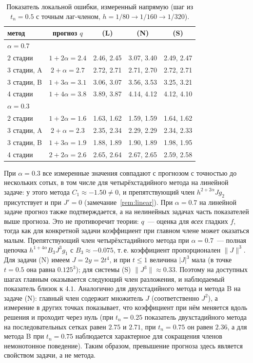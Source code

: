 \documentclass[11pt,a4paper]{article}
\theoremstyle{plain}
\theoremstyle{definition}
\begin{document}
\begin{table}[ht]
\centering\small
\caption{Показатель локальной ошибки, измеренный напрямую (шаг из $t_n=0.5$ с точным лаг-членом, $h=1/80\to1/160\to1/320$).}\label{tab:local}
\begin{tabular}{lcccc}
\toprule
метод & прогноз $q$ & (L) & (N) & (S)\\
\midrule
\multicolumn{5}{l}{$\alpha=0.7$}\\
2 стадии & $1+2\alpha=2.4$ & 2.46, 2.45 & 3.07, 3.40 & 2.49, 2.47\\
3 стадии, A & $2+\alpha=2.7$ & 2.72, 2.71 & 2.71, 2.70 & 2.72, 2.71\\
3 стадии, B & $1+3\alpha=3.1$ & 3.06, 3.07 & 3.56, 3.53 & 3.25, 3.21\\
4 стадии & $1+4\alpha=3.8$ & 3.89, 3.87 & 4.14, 4.12 & 4.12, 4.10\\
\midrule
\multicolumn{5}{l}{$\alpha=0.3$}\\
2 стадии & $1+2\alpha=1.6$ & 1.63, 1.62 & 1.59, 1.59 & 1.64, 1.62\\
3 стадии, A & $2+\alpha=2.3$ & 2.35, 2.34 & 2.29, 2.29 & 2.34, 2.33\\
3 стадии, B & $1+3\alpha=1.9$ & 1.88, 1.89 & 1.90, 1.89 & 1.98, 1.95\\
4 стадии & $2+2\alpha=2.6$ & 2.65, 2.64 & 2.67, 2.65 & 2.59, 2.58\\
\bottomrule
\end{tabular}
\end{table}

При $\alpha=0.3$ все измеренные значения совпадают с прогнозом с точностью до нескольких сотых, в том числе для четырёхстадийного метода на линейной задаче: у этого метода $C_1\approx-1.50\ne0$, и препятствующий член $h^{2+2\alpha}Jg_2$ присутствует и при $J'=0$ (замечание~\ref{rem:linear}). При $\alpha=0.7$ на линейной задаче прогноз также подтверждается, а на нелинейных задачах часть показателей выше прогноза. Это не противоречит теории: $q$~--- оценка для \emph{всех} гладких $f$, тогда как для конкретной задачи коэффициент при главном члене может оказаться малым. Препятствующий член четырёхстадийного метода при $\alpha=0.7$~--- полная цепочка $h^{1+4\alpha}B_3J^3g_1$ с $B_3\approx-0.075$, т.\,е. коэффициент пропорционален $\|J\|^3$. Для задачи (N) имеем $J=2y=2t^4$, и при $t\le1$ величина $|J|^3$ мала (в точке $t=0.5$ она равна $0.125^3$); для системы (S) $\|J^3\|\approx0.33$. Поэтому на доступных шагах главным оказывается следующий член разложения, и наблюдаемый показатель близок к $4.1$. Аналогично для двухстадийного метода и метода B на задаче (N): главный член содержит множитель $J$ (соответственно $J^2$), а измерение в других точках показывает, что коэффициент при нём меняется вдоль решения и проходит через нуль (при $t_n=0.25$ показатель двухстадийного метода на последовательных сетках равен $2.75$ и $2.71$, при $t_n=0.75$ он равен $2.36$, а для метода B при $t_n=0.75$ наблюдается характерное для сокращения членов немонотонное поведение). Таким образом, превышение прогноза здесь является свойством задачи, а не метода.
\end{document}
